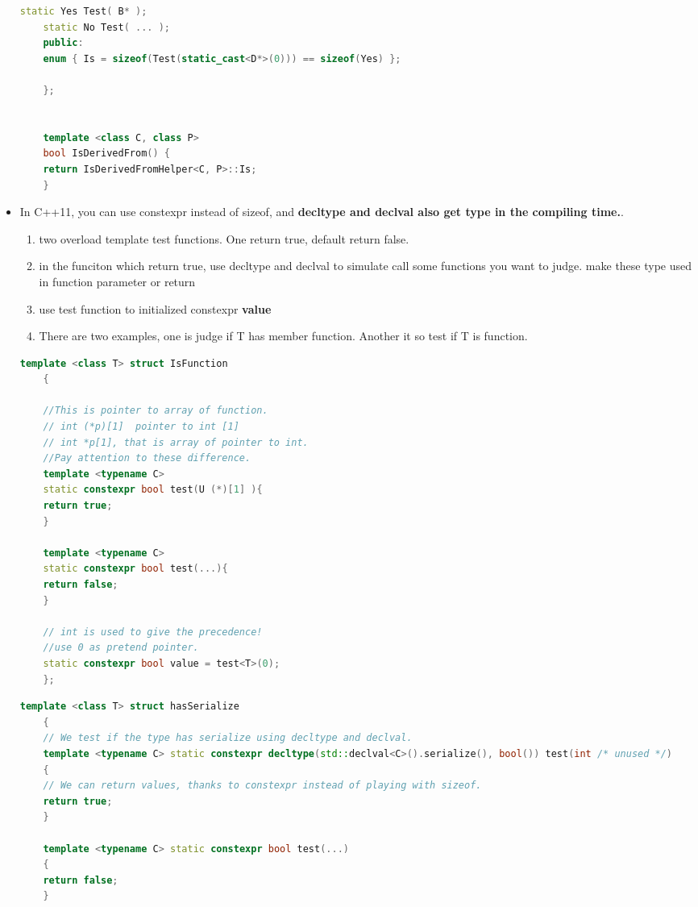 \documentclass[a4paper,12pt,twoside]{book}
\begin{document}
\begin{itemize}
\begin{lstlisting}[frame=single, language=c++]
	static Yes Test( B* );
	static No Test( ... );
	public:
	enum { Is = sizeof(Test(static_cast<D*>(0))) == sizeof(Yes) };
	
	};
	
	
	template <class C, class P> 
	bool IsDerivedFrom() {
	return IsDerivedFromHelper<C, P>::Is;
	}
	\end{lstlisting}
	
	\item In C++11, you can use constexpr instead of sizeof, and \textbf{decltype and declval also get type in the compiling time.}. 
	\begin{enumerate}
		\item two overload template test functions. One return true, default return false.
		\item in the funciton which return true, use decltype and declval to simulate call some functions you want to judge. make these type used in function parameter or return 
		\item use test function to initialized constexpr \textbf{value} 
		\item There are two examples, one is judge if T has member function. Another it so test if T is function.
	\end{enumerate}
	\begin{lstlisting}[frame=single, language=c++]
	template <class T> struct IsFunction
	{
	
	//This is pointer to array of function.
	// int (*p)[1]  pointer to int [1]
	// int *p[1], that is array of pointer to int.
	//Pay attention to these difference. 
	template <typename C> 
	static constexpr bool test(U (*)[1] ){
	return true;
	}
	
	template <typename C> 
	static constexpr bool test(...){
	return false;
	}
	
	// int is used to give the precedence!
	//use 0 as pretend pointer.
	static constexpr bool value = test<T>(0);
	};
	\end{lstlisting}
	
	\begin{lstlisting}[frame=single, language=c++]
	template <class T> struct hasSerialize
	{
	// We test if the type has serialize using decltype and declval.
	template <typename C> static constexpr decltype(std::declval<C>().serialize(), bool()) test(int /* unused */)
	{
	// We can return values, thanks to constexpr instead of playing with sizeof.
	return true;
	}
	
	template <typename C> static constexpr bool test(...)
	{
	return false;
	}
	

\end{lstlisting}
\end{itemize}
\end{document}
